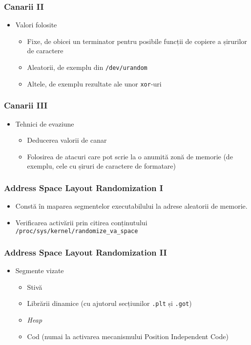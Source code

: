 \documentclass[xcolor={table}]{beamer}
\begin{document}
    \begin{frame}
		\frametitle{Canarii II}\pause
		\begin{itemize}[<+->]
		    \item Valori folosite
		        \begin{itemize}
			        \item Fixe, de obicei un terminator pentru posibile funcții de copiere a șirurilor de caractere
			        \item Aleatorii, de exemplu din \texttt{/dev/urandom}
			        \item Altele, de exemplu rezultate ale unor \texttt{xor}-uri
			    \end{itemize}
        \end{itemize}
    \end{frame}
    
    \begin{frame}
		\frametitle{Canarii III}\pause
		\begin{itemize}[<+->]
		    \item Tehnici de evaziune
		        \begin{itemize}
			        \item Deducerea valorii de canar
			        \item Folosirea de atacuri care pot scrie la o anumită zonă de memorie (de exemplu, cele cu șiruri de caractere de formatare)
			    \end{itemize}
        \end{itemize}
    \end{frame}
    
    \begin{frame}
		\frametitle{Address Space Layout Randomization I}\pause
		\begin{itemize}[<+->]
		    \item Constă în maparea segmentelor executabilului la adrese aleatorii de memorie.
		    \item Verificarea activării prin citirea conținutului \texttt{/proc/sys/kernel/randomize_va_space}
        \end{itemize}
    \end{frame}
    
    \begin{frame}
		\frametitle{Address Space Layout Randomization II}\pause
		\begin{itemize}[<+->]
		    \item Segmente vizate
		        \begin{itemize}
			        \item Stivă
			        \item Librării dinamice (cu ajutorul secțiunilor \texttt{.plt} și \texttt{.got})
			        \item \textit{Heap}
			        \item Cod (numai la activarea mecanismului Position Independent Code)
			    \end{itemize}
        \end{itemize}
    \end{frame}
    
\end{document}
